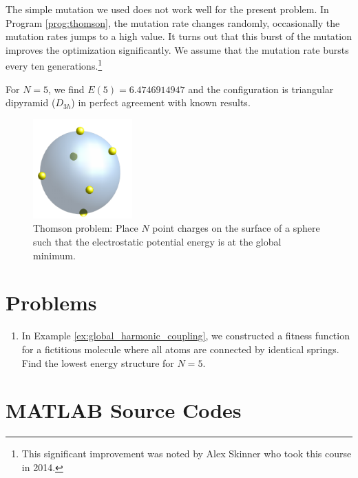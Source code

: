 The simple mutation we used does not work well for the present problem. In Program \ref{prog:thomson}, the mutation rate changes randomly, occasionally the mutation rates jumps to a high value. It turns out that this burst of the mutation improves the optimization significantly.  We assume that the mutation rate bursts every ten generations.\footnote{This significant improvement was noted by Alex Skinner who took this course in 2014.}

For $N=5$, we find $E(5)=6.4746914947$ and the configuration is triangular dipyramid ($D_{3h}$) in perfect agreement with known results.

\begin{figure}
\centering
\includegraphics[width=1.5in]{19.Optimization/thomson.pdf}
\caption{Thomson problem:  Place $N$ point charges on the surface of a sphere such that the electrostatic potential energy is at the global minimum.}
\label{fig:thomson} 
\end{figure}

\newpage
\noindent
\section{Problems}

\begin{enumerate}[labelwidth=0.5cm,labelindent=0cm,leftmargin=*,label=\bfseries \thechapter.\arabic*,align=left]
\item
In Example \ref{ex:global_harmonic_coupling}, we constructed a fitness function for a fictitious molecule where all atoms are connected by identical springs.  Find the lowest energy structure for $N=5$.

\end{enumerate}

\newpage
\noindent
\section*{MATLAB Source Codes}


